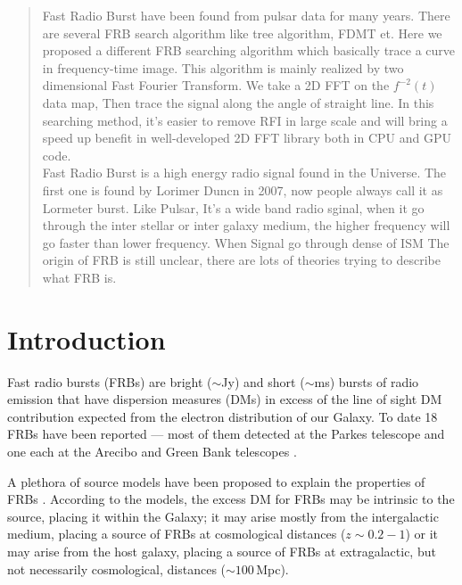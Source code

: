 \documentclass[twocolumn]{aastex61}
\begin{document}
\begin{abstract}

Fast Radio Burst have been found from pulsar data for many years. There are several FRB search algorithm like tree algorithm, FDMT et. Here we proposed a different FRB searching algorithm which basically trace a curve in frequency-time image. This algorithm is mainly realized by two dimensional Fast Fourier Transform. We take a 2D FFT on the $f^{-2}(t)$ data map, Then trace the signal along the angle of straight line. In this searching method, it's easier to remove RFI in large scale and will bring a speed up benefit in well-developed 2D FFT library both in CPU and GPU code. \\


Fast Radio Burst is a high energy radio signal found in the Universe. The first one is found by Lorimer Duncn in 2007, now people always call it as Lormeter burst. Like Pulsar, It’s a wide band radio sginal, when it go through the inter stellar or inter galaxy medium, the higher frequency will go faster than lower frequency. When Signal go through dense of ISM  The origin of FRB is still unclear, there are lots of theories trying to describe what FRB is.  \\







\end{abstract}


\section{Introduction}
 \label{sec:intro}
Fast radio bursts (FRBs) are bright ($\sim$Jy) and short ($\sim$ms) bursts of radio emission that have dispersion measures (DMs) in excess of the line of sight DM contribution expected from the electron distribution of our Galaxy. To date 18 FRBs have been reported
 --- most of them detected at the Parkes telescope \citep{lbm+07,tsb+13,bb14,kskl12,rsj15,pbb+15,kjb+16,cpk+16,rsb+16} and one each at the Arecibo \citep{sch+14} and Green Bank telescopes \citep{mls+15}. 

A plethora of source models have been proposed to explain the properties of FRBs \citep[see e.g.][for a brief review]{katz16}. According to the models, the excess DM for FRBs may be intrinsic to the source, placing it within the Galaxy; it may arise mostly from the intergalactic medium, placing a source of FRBs at cosmological distances ($z\sim0.2-1$) or it may arise from the host galaxy, placing a source of FRBs at extragalactic, but not necessarily cosmological, distances ($\sim100$\,Mpc).
\end{document}
